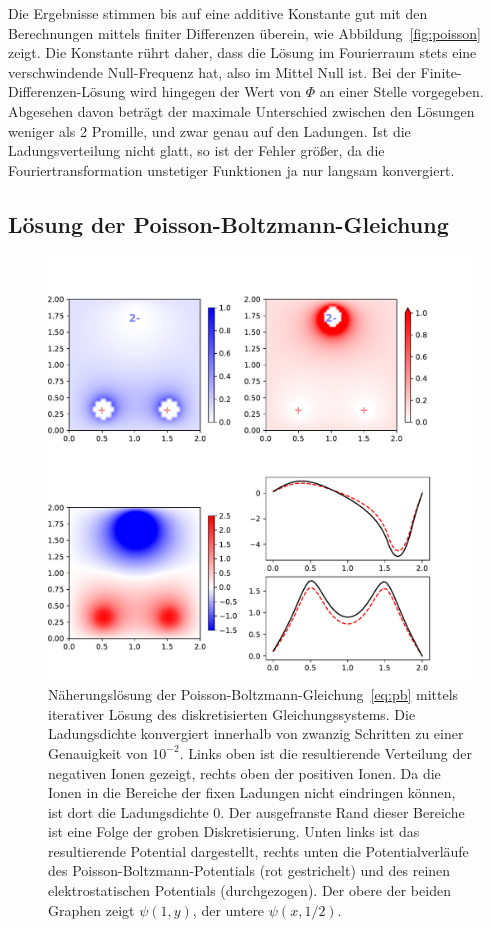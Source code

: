 Die Ergebnisse stimmen bis auf eine additive Konstante gut mit den
Berechnungen mittels finiter Differenzen überein, wie
Abbildung~\ref{fig:poisson} zeigt. Die Konstante rührt daher, dass die
Lösung im Fourierraum stets eine verschwindende Null-Frequenz hat,
also im Mittel Null ist. Bei der Finite-Differenzen-Lösung wird
hingegen der Wert von $\Phi$ an einer Stelle vorgegeben. Abgesehen
davon beträgt der maximale Unterschied zwischen den Lösungen weniger
als 2 Promille, und zwar genau auf den Ladungen. Ist die
Ladungsverteilung nicht glatt, so ist der Fehler größer, da die
Fouriertransformation unstetiger Funktionen ja nur langsam
konvergiert.

\subsection{Lösung der Poisson-Boltzmann-Gleichung}

\begin{figure}
  \centering
  \includegraphics[width=\textwidth]{plots/pb}
  \caption{Näherungslösung der
    Poisson-Boltzmann-Gleichung~\eqref{eq:pb} mittels iterativer
    Lösung des diskretisierten Gleichungssystems. Die Ladungsdichte
    konvergiert innerhalb von zwanzig Schritten zu einer Genauigkeit
    von $10^{-2}$. Links oben ist die resultierende Verteilung der
    negativen Ionen gezeigt, rechts oben der positiven Ionen. Da die
    Ionen in die Bereiche der fixen Ladungen nicht eindringen können,
    ist dort die Ladungsdichte 0. Der ausgefranste Rand dieser
    Bereiche ist eine Folge der groben Diskretisierung. Unten links
    ist das resultierende Potential dargestellt, rechts unten die
    Potentialverläufe des Poisson-Boltzmann-Potentials (rot
    gestrichelt) und des reinen elektrostatischen Potentials
    (durchgezogen). Der obere der beiden Graphen zeigt
    $\psi(1,y)$, der untere $\psi(x, 1/2)$.}
  \label{fig:pb}
\end{figure}

